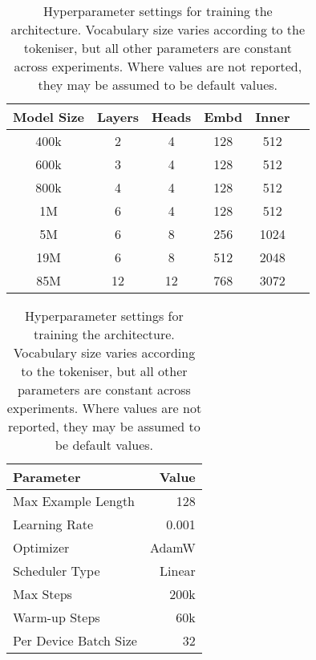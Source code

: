 \begin{table}[t]
    \begin{minipage}{.5\linewidth}
        \centering
        \small
        \begin{tabular}{cccccc}
            \toprule
            Model Size & Layers & Heads & Embd & Inner \\
            \midrule
            400k & 2 & 4 & 128 & 512 \\ 
            600k & 3 & 4 & 128 & 512 \\ 
            800k & 4 & 4 & 128 & 512 \\ 
            1M & 6 & 4 & 128 & 512 \\ 
            5M & 6 & 8 & 256 & 1024 \\ 
            19M & 6 & 8 & 512 & 2048 \\ 
            85M & 12 & 12 & 768 & 3072 \\ 
            \bottomrule
        \end{tabular}
        \caption{Parameters for \gpt model of varying sizes. Where values are not reported, they may be assumed to be default values.}
        \label{tab:14-model_sizes}
    \end{minipage}
    \hfill
    \begin{minipage}{.5\linewidth}
        \centering
        \small
        \begin{tabular}{lr}
            \toprule
            Parameter & Value \\
            \midrule
            Max Example Length & 128 \\
            Learning Rate & 0.001\\
            Optimizer & AdamW \\
            Scheduler Type & Linear\\
            Max Steps & 200k \\
            Warm-up Steps & 60k \\
            Per Device Batch Size & 32 \\
            \bottomrule
        \end{tabular}
        \caption{Hyperparameter settings for training the \gpt architecture. Vocabulary size varies according to the tokeniser, but all other parameters are constant across experiments. Where values are not reported, they may be assumed to be default values.}
        \label{tab:14-trainingparams}
    \end{minipage}
\end{table}

